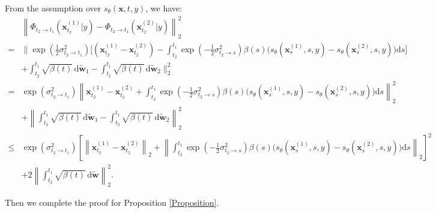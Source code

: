 From the assumption over $s_{\theta}(\mathbf{x},t,y)$, we have:
\begin{equation}
\begin{aligned}
    & \left\| \Phi_{t_2\rightarrow t_1}\left(\mathbf{x}_{t_2}^{(1)} \vert y\right) 
    -\Phi_{t_2\rightarrow t_1}\left(\mathbf{x}_{t_2}^{(2)} \vert y\right) \right\|_2^2 \\ 
    = & \Bigg\|\exp\left(\frac{1}{2}\sigma^2_{t_2 \rightarrow t_1}\right) 
    \Bigg[(\mathbf{x}_{t_2}^{(1)}-\mathbf{x}_{t_2}^{(2)}) 
    - \int_{t_2}^{t_1} \exp\left(-\frac{1}{2} \sigma^2_{t_2 \rightarrow s} \right) 
    \beta(s) \big( s_{\theta}(\mathbf{x}_{s}^{(1)},s,y) 
    - s_{\theta}(\mathbf{x}_{s}^{(2)},s,y) \big) \textrm{d}s \Bigg] \\
    & + \int_{t_2}^{t_1} \sqrt{\beta( t )} \, \textrm{d} \tilde{\mathbf{w}}_1 
    - \int_{t_2}^{t_1} \sqrt{\beta( t )} \, \textrm{d} \tilde{\mathbf{w}}_2 \Bigg\|_2^2 \\
    = & \exp\left(\sigma^2_{t_2 \rightarrow t_1}\right) 
    \left\| \mathbf{x}_{t_2}^{(1)}-\mathbf{x}_{t_2}^{(2)} 
    + \int_{t_2}^{t_1} \exp\left(-\frac{1}{2} \sigma^2_{t_2 \rightarrow s} \right) 
    \beta(s) \big( s_{\theta}(\mathbf{x}_{s}^{(1)},s,y) 
    - s_{\theta}(\mathbf{x}_{s}^{(2)},s,y) \big) \textrm{d}s \right\|_2^2  \\
    & + \left\| \int_{t_2}^{t_1} \sqrt{\beta( t )} \, \textrm{d} \tilde{\mathbf{w}}_1 
    - \int_{t_2}^{t_1} \sqrt{\beta( t )} \, \textrm{d} \tilde{\mathbf{w}}_2 \right\|_2^2 \\
    \leq & \exp\left(\sigma^2_{t_2 \rightarrow t_1}\right) 
    \left[  \left\|\mathbf{x}_{t_2}^{(1)}-\mathbf{x}_{t_2}^{(2)}\right\|_2 
    + \left\| \int_{t_2}^{t_1} \exp\left(-\frac{1}{2} \sigma^2_{t_2 \rightarrow s} \right) 
    \beta(s) \big( s_{\theta}(\mathbf{x}_{s}^{(1)},s,y) 
    - s_{\theta}(\mathbf{x}_{s}^{(2)},s,y) \big) \textrm{d}s \right\|_2 \right]^2  \\
    & + 2 \left\| \int_{t_2}^{t_1} \sqrt{\beta( t )} \, \textrm{d} \tilde{\mathbf{w}} \right\|_2^2.
\end{aligned}
\end{equation}

Then we complete the proof for Proposition \ref{Proposition}.


